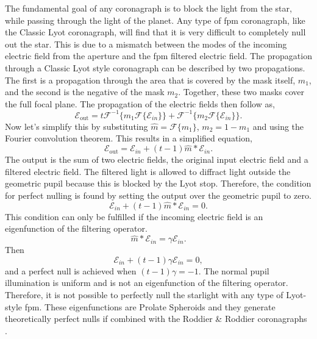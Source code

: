 \documentclass[letterpaper]{ar-1col}
\newcommand{\fourier}[1]{\mathcal{F}\{#1\}}
\newcommand{\invfourier}[1]{\mathcal{F}^{-1}\{#1\}}
\begin{document}
The fundamental goal of any coronagraph is to block the light from the star, while passing through the light of the planet.
%
Any type of \ac{fpm} coronagraph, like the Classic Lyot coronagraph, will find that it is very difficult to completely null out the star.
%
This is due to a mismatch between the modes of the incoming electric field from the aperture and the \ac{fpm} filtered electric field.
%
The propagation through a Classic Lyot style coronagraph can be described by two propagations.
%
The first is a propagation through the area that is covered by the mask itself, $m_1$, and the second is the negative of the mask $m_2$.
%
Together, these two masks cover the full focal plane.
%
The propagation of the electric fields then follow as,
\begin{equation}
    \mathcal{E}_{\mathrm{out}} = t\invfourier{m_1 \fourier{\mathcal{E}_{in}}} + \invfourier{m_2 \fourier{\mathcal{E}_{in}}}.
\end{equation}
Now let's simplify this by substituting $\hat{m}=\fourier{m_1}$, $m_2 = 1 - m_1$ and using the Fourier convolution theorem. This results in a simplified equation,
\begin{equation}
    \mathcal{E}_{\mathrm{out}} = \mathcal{E}_{in} + (t-1)\hat{m}*\mathcal{E}_{in}.
\end{equation}
The output is the sum of two electric fields, the original input electric field and a filtered electric field.
%
The filtered light is allowed to diffract light outside the geometric pupil because this is blocked by the Lyot stop.
%
Therefore, the condition for perfect nulling is found by setting the output over the geometric pupil to zero. 
\begin{equation}
    \mathcal{E}_{in} + (t-1)\hat{m}*\mathcal{E}_{in} = 0.
\end{equation}
This condition can only be fulfilled if the incoming electric field is an eigenfunction of the filtering operator.
\begin{equation}
    \hat{m}*\mathcal{E}_{in} = \gamma \mathcal{E}_{in}.
\end{equation}
Then
\begin{equation}
    \mathcal{E}_{in} + (t-1)\gamma \mathcal{E}_{in} = 0,
\end{equation}
and a perfect null is achieved when $(t-1)\gamma = -1$.
%
The normal pupil illumination is uniform and is not an eigenfunction of the filtering operator.
%
Therefore, it is not possible to perfectly null the starlight with any type of Lyot-style \ac{fpm}.
%
These eigenfunctions are Prolate Spheroids and they generate theoretically perfect nulls if combined with the Roddier \& Roddier coronagraphs \citep{soummer2003stellar}.
\end{document}

